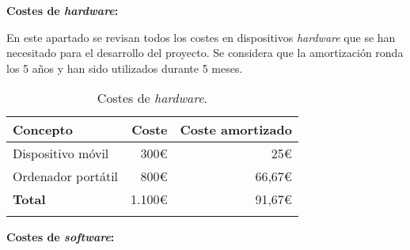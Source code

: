 \textbf{Costes de \emph{hardware}:}

En este apartado se revisan todos los costes en dispositivos
\emph{hardware} que se han necesitado para el desarrollo del proyecto.
Se considera que la amortización ronda los 5 años y han sido utilizados
durante 5 meses.

\begin{longtable}[]{@{}lrr@{}}
\toprule
\begin{minipage}[b]{0.29\columnwidth}\raggedright\strut
\textbf{Concepto}\strut
\end{minipage} & \begin{minipage}[b]{0.18\columnwidth}\raggedright\strut
\textbf{Coste}\strut
\end{minipage} & \begin{minipage}[b]{0.32\columnwidth}\raggedright\strut
\textbf{Coste amortizado}\strut
\end{minipage}\tabularnewline
\midrule
\endhead
\begin{minipage}[t]{0.29\columnwidth}\raggedright\strut
Dispositivo móvil\strut
\end{minipage} & \begin{minipage}[t]{0.18\columnwidth}\raggedright\strut
300\euro{}\strut
\end{minipage} & \begin{minipage}[t]{0.32\columnwidth}\raggedright\strut
25\euro{}\strut
\end{minipage}\tabularnewline
\begin{minipage}[t]{0.29\columnwidth}\raggedright\strut
Ordenador portátil\strut
\end{minipage} & \begin{minipage}[t]{0.18\columnwidth}\raggedright\strut
800\euro{}\strut
\end{minipage} & \begin{minipage}[t]{0.32\columnwidth}\raggedright\strut
66,67\euro{}\strut
\end{minipage}\tabularnewline
\midrule
\begin{minipage}[t]{0.29\columnwidth}\raggedright\strut
\textbf{Total}\strut
\end{minipage} & \begin{minipage}[t]{0.18\columnwidth}\raggedright\strut
1.100\euro{}\strut
\end{minipage} & \begin{minipage}[t]{0.32\columnwidth}\raggedright\strut
91,67\euro{}\strut
\end{minipage}\tabularnewline
\bottomrule
\caption{Costes de \emph{hardware}.}
\end{longtable}
\newpage
\textbf{Costes de \emph{software}:}


